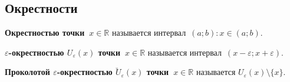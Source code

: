 \subsection{Окрестности}
 \textbf{Окрестностью точки~$x \in \mathbb R$} называется интервал~$(a; b) \colon x \in (a; b)$.

\textbf{$\varepsilon$-окрестностью $U_\varepsilon(x)$ точки~$x \in \mathbb R$} называется интервал~$(x - \varepsilon; x + \varepsilon)$.

\textbf{Проколотой $\varepsilon$-окрестностью $\breve U_\varepsilon(x)$ точки~$x \in \mathbb R$} называется $U_\varepsilon(x) \setminus \{ x \}$.